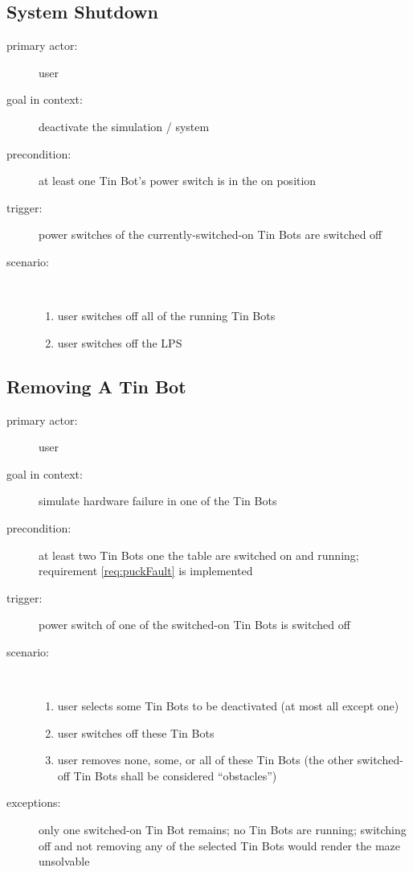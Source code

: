 \documentclass[a4paper,parskip,headheight=38pt]{scrartcl} %
\begin{document}
\subsection{System Shutdown}
\begin{description}
\item[primary actor:] user
\item[goal in context:] deactivate the simulation / system
\item[precondition:] at least one Tin Bot's power switch is in the on position
\item[trigger:] power switches of the currently-switched-on Tin Bots are switched off
\item[scenario:] \
\begin{enumerate}
	\item user switches off all of the running Tin Bots
	\item user switches off the LPS
\end{enumerate}
\end{description}

\subsection{Removing A Tin Bot}
\begin{description}
\item[primary actor:] user
\item[goal in context:] simulate hardware failure in one of the Tin Bots
\item[precondition:] at least two Tin Bots one the table are switched on and running; requirement \ref{req:puckFault} is implemented
\item[trigger:] power switch of one of the switched-on Tin Bots is switched off
\item[scenario:] \
\begin{enumerate}
	\item user selects some Tin Bots to be deactivated (at most all except one)
	\item user switches off these Tin Bots
	\item user removes none, some, or all of these Tin Bots (the other switched-off Tin Bots shall be considered \enquote{obstacles})
\end{enumerate}
\item[exceptions:] only one switched-on Tin Bot remains; no Tin Bots are running; switching off and not removing any of the selected Tin Bots would render the maze unsolvable
\end{description}
\end{document}
